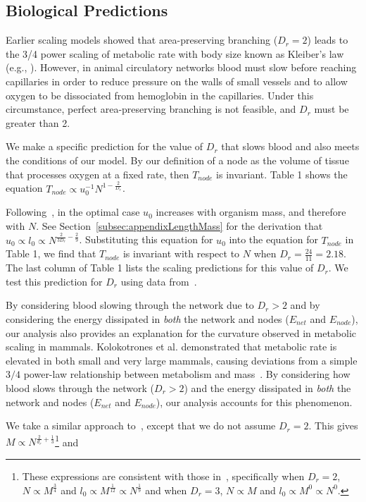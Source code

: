 \documentclass[12pt]{article}
\begin{document}
\subsection{Biological Predictions}
\label{sec:bio-predictions}



Earlier scaling models showed that area-preserving
branching ($D_r = 2$) leads to the 3/4 power scaling of metabolic rate with body
size known as Kleiber's law (e.g., \cite{west97, banavar10}).
However, in animal circulatory networks blood must slow before reaching capillaries in order to
reduce pressure on the walls of small vessels and to allow oxygen to be
dissociated from hemoglobin in the capillaries.   Under this circumstance,
perfect area-preserving branching is not feasible, and $D_r$ must be greater than 2.

We make a specific prediction for the value of $D_r$ that slows blood and also meets the conditions of our model. By our definition of a node as the volume of tissue that processes oxygen at a fixed rate, then $T_{node}$ is invariant. Table 1 shows the equation $T_{node} \propto u_0^{-1}N^{1-\frac{2}{D_r}}$.

Following~\cite{banavar10}, in the optimal case $u_0$ increases with organism mass, and therefore with $N$. See Section~\ref{subsec:appendixLengthMass} for the derivation that $u_0 \propto l_0 \propto N^{\frac{2}{3D_r} - \frac{2}{9}}$. Substituting this equation for $u_0$ into the equation for $T_{node}$ in Table 1, we find that $T_{node}$ is invariant with respect to $N$ when $D_r = \frac{24}{11} = 2.18$. The last column of Table 1 lists the scaling predictions for this value of $D_r$. We test this prediction for $D_r$ using data from~\cite{kolokotrones2010curvature}.


By considering blood slowing through the network due to $D_r > 2$ and by considering the energy dissipated in \emph{both} the network and 
nodes ($E_{net}$ and $E_{node}$), our analysis also provides an explanation for the curvature observed in
metabolic scaling in mammals. Kolokotrones et al.
demonstrated that metabolic rate is elevated in both small and very large mammals, causing
deviations from a simple $3/4$ power-law relationship between metabolism and
mass~\cite{kolokotrones2010curvature}. 
By considering how blood slows through the network ($D_r > 2$) and the energy dissipated in \emph{both} the network and 
nodes ($E_{net}$ and $E_{node}$), our analysis accounts for this phenomenon.


We take a similar approach to~\cite{banavar10}, except that we do
not assume $D_r=2$.  This gives $M \propto N^{\frac{2}{d_r} +
\frac{1}{3}}$\footnote{These expressions are consistent with those
in~\cite{banavar10}, specifically when $D_r=2$, $N\propto M^{\frac{3}{4}}$ and
$l_0 \propto M^{\frac{1}{12}}\propto N^{\frac{1}{9}}$ and when $D_r=3$, $N\propto M$ and $l_0\propto M^0 \propto N^0$.} and
\end{document}
